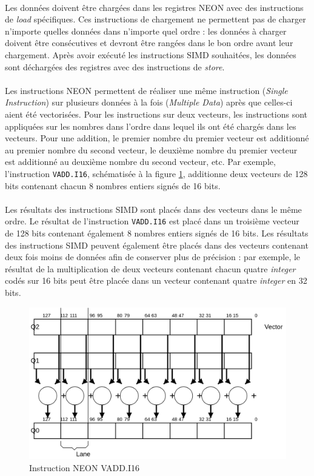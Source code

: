 \documentclass{article}
\begin{document}
    \paragraph{}
    Les données doivent être chargées dans les registres NEON avec des instructions de \emph{load} spécifiques. Ces instructions de chargement ne permettent pas de charger n'importe quelles données dans n'importe quel ordre : les données à charger doivent être consécutives et devront être rangées dans le bon ordre avant leur chargement. Après avoir exécuté les instructions SIMD souhaitées, les données sont déchargées des registres avec des instructions de \emph{store}.

    \paragraph{}
    Les instructions NEON permettent de réaliser une même instruction (\emph{Single Instruction}) sur plusieurs données à la fois (\emph{Multiple Data}) après que celles-ci aient été vectorisées. Pour les instructions sur deux vecteurs, les instructions sont appliquées sur les nombres dans l'ordre dans lequel ils ont été chargés dans les vecteurs. Pour une addition, le premier nombre du premier vecteur est additionné au premier nombre du second vecteur, le deuxième nombre du premier vecteur est additionné au deuxième nombre du second vecteur, etc. Par exemple, l'instruction \texttt{VADD.I16}, schématisée à la figure \ref{fig:neon-example}, additionne deux vecteurs de 128 bits contenant chacun 8 nombres entiers signés de 16 bits.

    \paragraph{}
    Les résultats des instructions SIMD sont placés dans des vecteurs dans le même ordre. Le résultat de l'instruction \texttt{VADD.I16} est placé dans un troisième vecteur de 128 bits contenant également 8 nombres entiers signés de 16 bits. Les résultats des instructions SIMD peuvent également être placés dans des vecteurs contenant deux fois moins de données afin de conserver plus de précision : par exemple, le résultat de la multiplication de deux vecteurs contenant chacun quatre \emph{integer} codés sur 16 bits peut être placée dans un vecteur contenant quatre \emph{integer} en 32 bits.

    \begin{figure}[H]
        \centering
        \includegraphics[width=.6\linewidth]{./images/vadd-i16.png}
        \caption{Instruction NEON VADD.I16}
        \label{fig:neon-example}
    \end{figure}
\end{document}
